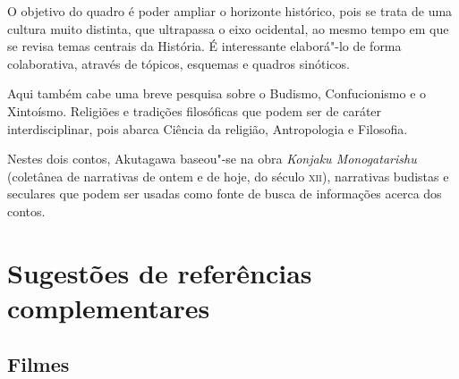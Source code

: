 \documentclass[12pt]{extarticle}
\begin{document}
O objetivo do quadro é poder ampliar o horizonte histórico, pois se trata de
uma cultura muito distinta, que ultrapassa o eixo ocidental, ao mesmo tempo em
que se revisa temas centrais da História. É interessante elaborá"-lo de forma
colaborativa, através de tópicos, esquemas e quadros sinóticos.

Aqui também cabe uma breve pesquisa sobre o Budismo, Confucionismo e o
Xintoísmo. Religiões e tradições filosóficas que podem ser de caráter
interdisciplinar, pois abarca Ciência da religião, Antropologia e Filosofia.

Nestes dois contos, Akutagawa baseou"-se na obra \textit{Konjaku Monogatarishu}
(coletânea de narrativas de ontem e de hoje, do século \textsc{xii}),
narrativas budistas e seculares que podem ser usadas como fonte de busca de
informações acerca dos contos.

\section{Sugestões de referências complementares}\label{sugestoes}

\subsection{Filmes}
\end{document}
